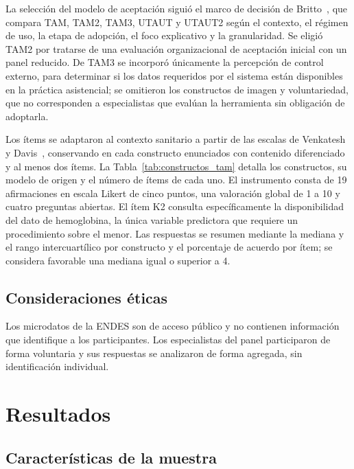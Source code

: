 \documentclass[final,5p,times,twocolumn,number,lefttitle]{elsarticle}
\begin{document}
La selección del modelo de aceptación siguió el marco de decisión de Britto~\citep{britto2026framework}, que compara TAM, TAM2, TAM3, UTAUT y UTAUT2 según el contexto, el régimen de uso, la etapa de adopción, el foco explicativo y la granularidad. Se eligió TAM2 por tratarse de una evaluación organizacional de aceptación inicial con un panel reducido. De TAM3 \citep{venkatesh2008tam3} se incorporó únicamente la percepción de control externo, para determinar si los datos requeridos por el sistema están disponibles en la práctica asistencial; se omitieron los constructos de imagen y voluntariedad, que no corresponden a especialistas que evalúan la herramienta sin obligación de adoptarla.

Los ítems se adaptaron al contexto sanitario a partir de las escalas de Venkatesh y Davis~\citep{venkatesh2000tam2}, conservando en cada constructo enunciados con contenido diferenciado y al menos dos ítems. La Tabla~\ref{tab:constructos_tam} detalla los constructos, su modelo de origen y el número de ítems de cada uno. El instrumento consta de 19 afirmaciones en escala Likert de cinco puntos, una valoración global de 1 a 10 y cuatro preguntas abiertas. El ítem K2 consulta específicamente la disponibilidad del dato de hemoglobina, la única variable predictora que requiere un procedimiento sobre el menor. Las respuestas se resumen mediante la mediana y el rango intercuartílico por constructo y el porcentaje de acuerdo por ítem; se considera favorable una mediana igual o superior a 4.

\subsection{Consideraciones éticas}

Los microdatos de la ENDES son de acceso público y no contienen información que identifique a los participantes. Los especialistas del panel participaron de forma voluntaria y sus respuestas se analizaron de forma agregada, sin identificación individual.

\section{Resultados}
\label{resultados}

\subsection{Características de la muestra}
\label{sec:muestra}
\end{document}
